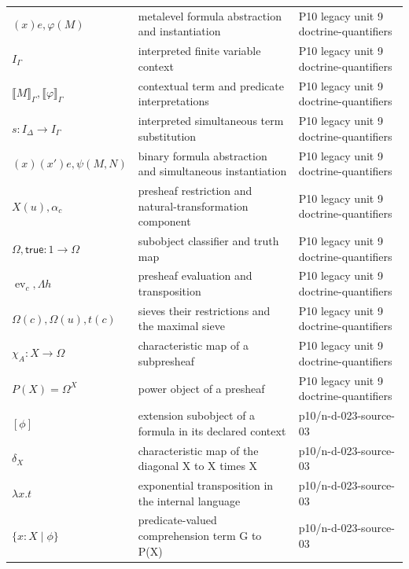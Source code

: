 \begin{longtable}{@{}p{}p{}p{}@{}}
\((x)e,\allowbreak \varphi(M)\) & metalevel formula abstraction and instantiation & P10 legacy unit 9 doctrine-\allowbreak{}quantifiers \\
\(I_\Gamma\) & interpreted finite variable context & P10 legacy unit 9 doctrine-\allowbreak{}quantifiers \\
\(\llbracket M\rrbracket_\Gamma,\allowbreak \llbracket\varphi\rrbracket_\Gamma\) & contextual term and predicate interpretations & P10 legacy unit 9 doctrine-\allowbreak{}quantifiers \\
\(s:I_\Delta\to I_\Gamma\) & interpreted simultaneous term substitution & P10 legacy unit 9 doctrine-\allowbreak{}quantifiers \\
\((x)(x')e,\allowbreak \psi(M,\allowbreak N)\) & binary formula abstraction and simultaneous instantiation & P10 legacy unit 9 doctrine-\allowbreak{}quantifiers \\
\(X(u),\allowbreak \alpha_c\) & presheaf restriction and natural-transformation component & P10 legacy unit 9 doctrine-\allowbreak{}quantifiers \\
\(\Omega,\allowbreak \mathsf{true}:1\to\Omega\) & subobject classifier and truth map & P10 legacy unit 9 doctrine-\allowbreak{}quantifiers \\
\(\operatorname{ev}_c,\allowbreak \Lambda h\) & presheaf evaluation and transposition & P10 legacy unit 9 doctrine-\allowbreak{}quantifiers \\
\(\Omega(c),\allowbreak \Omega(u),\allowbreak t(c)\) & sieves their restrictions and the maximal sieve & P10 legacy unit 9 doctrine-\allowbreak{}quantifiers \\
\(\chi_A:X\to\Omega\) & characteristic map of a subpresheaf & P10 legacy unit 9 doctrine-\allowbreak{}quantifiers \\
\(P(X)=\Omega^X\) & power object of a presheaf & P10 legacy unit 9 doctrine-\allowbreak{}quantifiers \\
\([\phi]\) & extension subobject of a formula in its declared context & p10/\allowbreak{}n-\allowbreak{}d-\allowbreak{}023-\allowbreak{}source-\allowbreak{}03 \\
\(\delta_X\) & characteristic map of the diagonal X to X times X & p10/\allowbreak{}n-\allowbreak{}d-\allowbreak{}023-\allowbreak{}source-\allowbreak{}03 \\
\(\lambda x.t\) & exponential transposition in the internal language & p10/\allowbreak{}n-\allowbreak{}d-\allowbreak{}023-\allowbreak{}source-\allowbreak{}03 \\
\(\{x:X\mid\phi\}\) & predicate-valued comprehension term G to P(X) & p10/\allowbreak{}n-\allowbreak{}d-\allowbreak{}023-\allowbreak{}source-\allowbreak{}03 \\

\end{longtable}
